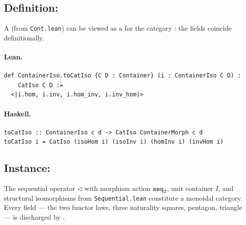 \documentclass[11pt,a4paper]{article}
\begin{document}
\subsection{Definition: }

\begin{defn}
A  (from \texttt{Cont.lean}) can be viewed as a 
for the category : the fields coincide definitionally.
\end{defn}

\paragraph{Lean.}
\begin{lstlisting}[style=lean]
def ContainerIso.toCatIso {C D : Container} (i : ContainerIso C D) :
    CatIso C D :=
  <|i.hom, i.inv, i.hom_inv, i.inv_hom|>
\end{lstlisting}

\paragraph{Haskell.}
\begin{lstlisting}[style=haskell]
toCatIso :: ContainerIso c d -> CatIso ContainerMorph c d
toCatIso i = CatIso (isoHom i) (isoInv i) (homInv i) (invHom i)
\end{lstlisting}


\subsection{Instance: }

\begin{defn}
The sequential operator $\triangleleft$ with morphism action $\texttt{seq}_2$, unit
container $I$, and structural isomorphisms from \texttt{Sequential.lean} constitute
a monoidal category.  Every field --- the two functor laws, three naturality
squares, pentagon, triangle --- is discharged by .
\end{defn}
\end{document}
